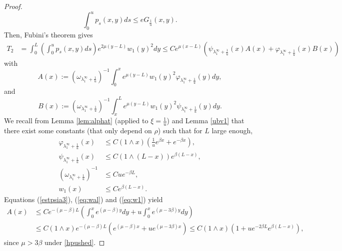 \documentclass[11pt]{article}
\theoremstyle{plain}
\newcommand\linf{\lambda_1^\infty}
\begin{document}
\begin{proof}
 \begin{equation*}
    \int_0^{u} p_s(x,y)ds \leqslant eG_{\frac{1}{u}}(x,y).
\end{equation*}
Then, Fubini's theorem gives
\begin{align}
  T_2&= \int_0^L\left(\int_0^{u} p_s(x,y) ds\right)e^{2\mu(y-L)}w_1(y)^2dy \leqslant Ce^{\mu(x-L)}\left(\psi_{\linf+\frac{1}{u}}(x)A(x)+\varphi_{\linf+\frac{1}{u}}(x)B(x)\right) \label{int:Green}
\end{align}  
with 
\begin{equation*}
A(x):= \left(\omega_{\linf+\frac{1}{u}}\right)^{-1}\int_0^xe^{\mu(y-L)}w_1(y)^2 \varphi_{\linf+\frac{1}{u}}(y)dy,
\end{equation*}
and 
\begin{equation*}
B(x):= \left(\omega_{\linf+\frac{1}{u}}\right)^{-1}\int_x^Le^{\mu(y-L)}w_1(y)^2 \psi_{\linf+\frac{1}{u}}(y)dy.
\end{equation*}
We recall from Lemma  \ref{lem:alphat} (applied to $\xi=\frac{1}{u}$) and Lemma \ref{ubv1} that there exist some constants (that only depend on $\rho$) such that for $L$ large enough,
\begin{align}
    \varphi_{\linf+\frac{1}{u}}(x)&\leqslant C(1\wedge x)\left(\frac{1}{u}e^{\beta x}+e^{-\beta x}\right), \label{estpsia3}\\
    \psi_{\linf+\frac{1}{u}}(x)&\leqslant C(1\wedge(L-x))e^{\beta(L-x)},
    \label{estphia3}\\
        \left(\omega_{\linf+\frac{1}{u}}\right)^{-1}&\leqslant Cue^{-\beta L},\label{eq:wal}\\
     w_1(x)&\leqslant Ce^{\beta(L-x)}.\label{eq:w1}
\end{align}
Equations (\ref{estpsia3}), (\ref{eq:wal}) and (\ref{eq:w1}) yield 
\begin{align}
A(x)&\leqslant Ce^{-(\mu-\beta) L}\left(\int_0^x e^{(\mu-\beta)y}dy + u\int_0^x e^{(\mu-3\beta)y}dy\right)\nonumber\\
&\leqslant C(1\wedge x)e^{-(\mu-\beta) L}\left(e^{(\mu-\beta)x}+ue^{(\mu-3\beta)x}\right)\leqslant C(1\wedge x)\left(1+ue^{-2\beta L}e^{\beta(L-x)}\right), 
\label{est:A}\end{align} since $\mu>3\beta$ under \eqref{hpushed}.

\end{proof}
\end{document}
